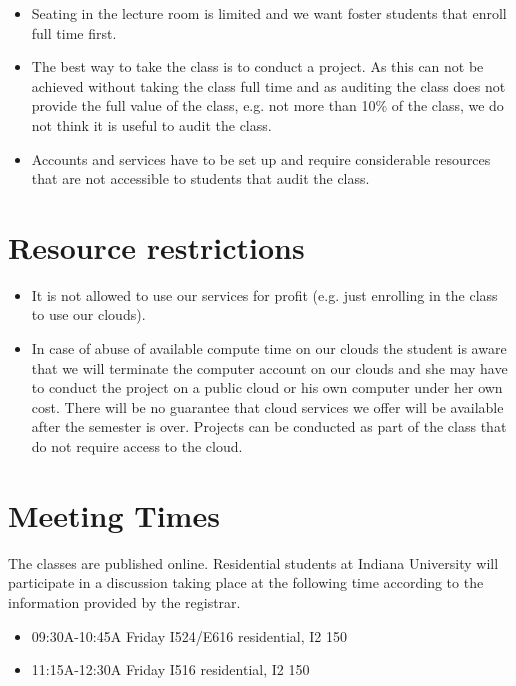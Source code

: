 \begin{itemize}
\item Seating in the lecture room is limited and we want foster
  students that enroll full time first.

\item The best way to take the class is to conduct a project. As this can
not be achieved without taking the class full time and as auditing the
class does not provide the full value of the class, e.g. not more than
10\% of the class, we do not think it is useful to audit the class.

\item  Accounts and services have to be set up and require
  considerable resources that are not accessible to students that
  audit the class.

\end{itemize}


\section{Resource restrictions}

\begin{itemize}
\item It is not allowed to use our services for profit (e.g. just
  enrolling in the class to use our clouds).
\item In case of abuse of available compute time on our clouds the
  student is aware that we will terminate the computer account on our
  clouds and she may have to conduct the project on a public cloud or
  his own computer under her own cost. There will be no guarantee that
  cloud services we offer will be available after the semester is
  over.  Projects can be conducted as part of the class that do not
  require access to the cloud.
\end{itemize}

\section{Meeting Times}\label{meeting-times}

The classes are published online. Residential students at Indiana
University will participate in a discussion taking place at the
following time according to the information provided by the registrar.

\begin{itemize}
\item 09:30A-10:45A Friday I524/E616 residential, I2 150
\item  11:15A-12:30A Friday I516 residential, I2 150
\end{itemize}

